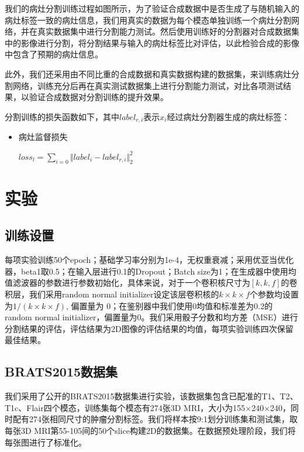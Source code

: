 \documentclass[letterpaper]{article} %
\begin{document}
我们的病灶分割训练过程如图所示，为了验证合成数据中是否生成了与随机输入的病灶标签一致的病灶信息，我们用真实的数据为每个模态单独训练一个病灶分割网络，并在真实数据集中进行分割能力测试。然后使用训练好的分割器对合成数据集中的影像进行分割，将分割结果与输入的病灶标签比对评估，以此检验合成的影像中包含了预期的病灶信息。

此外，我们还采用由不同比重的合成数据和真实数据构建的数据集，来训练病灶分割网络，训练充分后再在真实测试数据集上进行分割能力测试，对比各项测试结果，以验证合成数据对分割训练的提升效果。

分割训练的损失函数如下，其中$label_{r,i}$表示$x_i$经过病灶分割器生成的病灶标签：

\begin{itemize}
	\item 病灶监督损失

	\begin{center}
		$loss_{l}=\sum\limits_{i=0}\Vert{label_i-label_{r,i}}\Vert_{2}^{2}$
	\end{center}
	
\end{itemize}

\section{实验}
\subsection{训练设置}

每项实验训练50个epoch；基础学习率分别为1e-4，无权重衰减；采用优亚当优化器，beta1取0.5；在输入层进行0.1的Dropout；Batch size为1；在生成器中使用均值滤波器的参数进行参数初始化，具体来说，对于一个卷积核尺寸为$[k,k,f]$的卷积层，我们采用random normal initializer设定该层卷积核的$k\times k\times f$个参数均设置为$1/(k\times k\times f)$, 偏置量为 0；在鉴别器中我们使用0均值和标准差为0.2的random normal initializer，偏置量为0。我们采用骰子分数\cite{95dice1945measures}和均方差（MSE）\cite{94prasad1990the}进行分割结果的评估，评估结果为2D图像的评估结果的均值，每项实验训练四次保留最佳结果。

\subsection{BRATS2015数据集}

我们采用了公开的BRATS2015\cite{91menze:hal-00935640}数据集进行实验，该数据集包含已配准的T1、T2、T1c、Flair四个模态，训练集每个模态有274张3D MRI，大小为155$\times$240$\times$240，同时配有274张相同尺寸的肿瘤分割标签。我们将样本按9:1划分训练集和测试集，取每张3D MRI第55-105间的50个slice构建2D的数据集。在数据预处理阶段，我们将每张图进行了标准化。
\end{document}
